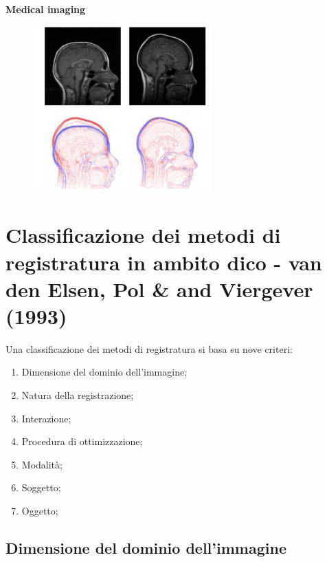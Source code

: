 \newpage
\textbf{Medical imaging}
\begin{figure}[H]
    \centering
    \includegraphics[width=\linewidth, keepaspectratio]{capitoli/immagini/imgs/medical-imaging.png}
\end{figure}

\newpage
\section{Classificazione dei metodi di registratura in ambito dico - van den Elsen, Pol \& and Viergever (1993)}

Una classificazione dei metodi di registratura si basa su nove criteri:

\begin{enumerate}
    \item Dimensione del dominio dell'immagine;
    \item Natura della registrazione;
    \item Interazione;
    \item Procedura di ottimizzazione;
    \item Modalità;
    \item Soggetto;
    \item Oggetto;
\end{enumerate}

\subsection{Dimensione del dominio dell'immagine}

